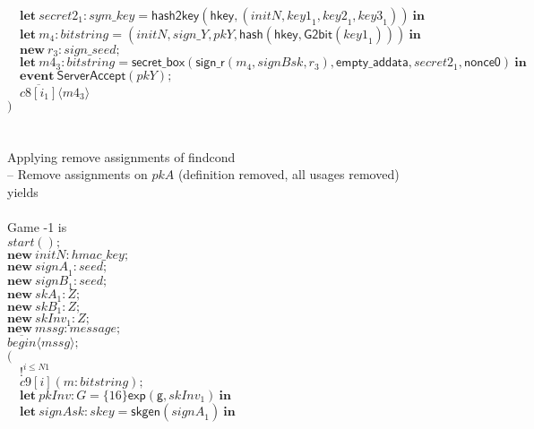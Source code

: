 \documentclass{article}
\newcommand{\cinput}[2]{{#1}({#2})}
\newcommand{\coutput}[2]{\overline{#1}\langle{#2}\rangle}
\newcommand{\kw}[1]{\mathbf{#1}}
\newcommand{\kwf}[1]{\mathsf{#1}}
\newcommand{\var}[1]{\mathit{#1}}
\newcommand{\kwt}[1]{\mathit{#1}}
\newcommand{\kwp}[1]{\mathit{#1}}
\newcommand{\kwc}[1]{\mathit{#1}}
\begin{document}
\begin{tabbing}
\>$\quad \kw{let}\ \var{secret2}_{1}: \kwt{sym{\_}key} = \kwf{hash2key}(\kwf{hkey}, \kwf{}(\var{initN}, \var{key1}_{1}, \var{key2}_{1}, \var{key3}_{1}))\ \kw{in}$\\
\>$\quad \kw{let}\ \var{m}_{4}: \kwt{bitstring} = \kwf{}(\var{initN}, \var{sign{\_}Y}, \var{pkY}, \kwf{hash}(\kwf{hkey}, \kwf{G2bit}(\var{key1}_{1})))\ \kw{in}$\\
\>$\quad \kw{new}\ \var{r}_{3}: \kwt{sign{\_}seed};$\\
\>$\quad \kw{let}\ \var{m4}_{3}: \kwt{bitstring} = \kwf{secret{\_}box}(\kwf{sign{\_}r}(\var{m}_{4}, \var{signBsk}, \var{r}_{3}), \kwf{empty{\_}addata}, \var{secret2}_{1}, \kwf{nonce0})\ \kw{in}$\\
\>$\quad \kw{event}\ \kwf{ServerAccept}(\var{pkY});$\\
\>$\quad \coutput{\kwc{c8}[\var{i}_{1}]}{\var{m4}_{3}}$\\
\>$)$\\
\\
\\
Applying remove assignments of findcond\\
\quad -- Remove assignments on $\var{pkA}$ (definition removed, all usages removed)\\
yields\\
\\
Game -1 is\\
\>$\cinput{\kwc{start}}{};$\\
\>$\kw{new}\ \var{initN}: \kwt{hmac{\_}key};$\\
\>$\kw{new}\ \var{signA}_{1}: \kwt{seed};$\\
\>$\kw{new}\ \var{signB}_{1}: \kwt{seed};$\\
\>$\kw{new}\ \var{skA}_{1}: \kwt{Z};$\\
\>$\kw{new}\ \var{skB}_{1}: \kwt{Z};$\\
\>$\kw{new}\ \var{skInv}_{1}: \kwt{Z};$\\
\>$\kw{new}\ \var{mssg}: \kwt{message};$\\
\>$\coutput{\kwc{begin}}{\var{mssg}};$\\
\>$($\\
\>$\quad !^{\var{i} \leq \kwp{N1}}$\\
\>$\quad \cinput{\kwc{c9}[\var{i}]}{\var{m}: \kwt{bitstring}};$\\
\>$\quad \kw{let}\ \var{pkInv}: \kwt{G} = \{16\}\kwf{exp}(\kwf{g}, \var{skInv}_{1})\ \kw{in}$\\
\>$\quad \kw{let}\ \var{signAsk}: \kwt{skey} = \kwf{skgen}(\var{signA}_{1})\ \kw{in}$\\

\end{tabbing}
\end{document}
